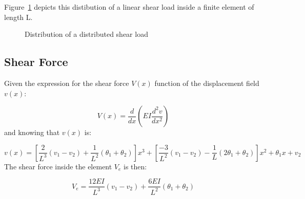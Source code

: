 Figure~\ref{fig:beam_finite_element_load_distribution} depicts this distibution of a linear shear load inside a finite element of length L.

\begin{figure}[h]
  \label{fig:beam_finite_element_load_distribution}
  \centering
  \caption{Distribution of a distributed shear load}
\end{figure}


\subsection{Shear Force}

Given the expression for the shear force $V(x)$ function of the displacement field $v(x)$:

\begin{equation}
  V(x) = \frac{d}{dx} \left( EI \frac{d^2v}{dx^2} \right)
\end{equation}
and knowing that $v(x)$ is:

\begin{equation}
  \label{eq:vertical_disp_field}
  v(x) = 
  \left[ \frac{2}{L^3} \left( v_1 - v_2 \right) + \frac{1}{L^2} \left( \theta_1 + \theta_2 \right) \right] x^3
  + \left[ \frac{-3}{L^2} \left( v_1 - v_2 \right) - \frac{1}{L} \left( 2 \theta_1 + \theta_2 \right) \right] x^2
  + \theta_1 x + v_2
\end{equation}
The shear force inside the element $V_e$ is then:

\[
  V_e = \frac{12EI}{L^3} \left( v_1 - v_2 \right) + \frac{6EI}{L^2} \left( \theta_1 + \theta_2 \right)
\]

